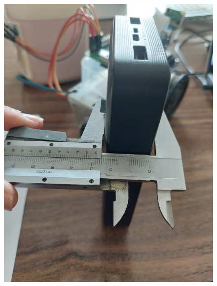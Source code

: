 \begin{figure}[ht!]
	\centering
	\begin{minipage}{0.4\linewidth}
		\centering
		\includegraphics[width=\linewidth]{figs/cap5/calib1.jpeg}
		\caption*{\centering}
	\end{minipage}
	\hspace{2cm}
	\begin{minipage}{0.4\linewidth}
		\centering

\end{minipage}
\end{figure}

